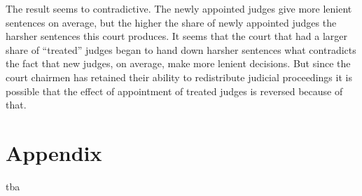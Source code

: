 \documentclass[12pt]{article}
\numberwithin{equation}{section}
\numberwithin{table}{section}
\numberwithin{figure}{section}
\begin{document}
The result seems to contradictive. The newly appointed judges give more lenient sentences on average, but the higher the share of newly appointed judges the harsher sentences this court produces. 
It seems that the court that had a larger share of ``treated'' judges began to hand down harsher sentences what contradicts the fact that new judges, on average, make more lenient decisions. 
But since the court chairmen has retained their ability to redistribute judicial proceedings it is possible that the effect of appointment of treated judges is reversed because of that. 



\newpage
{}


\newpage
\appendix 

\section{Appendix}
tba
\end{document}
